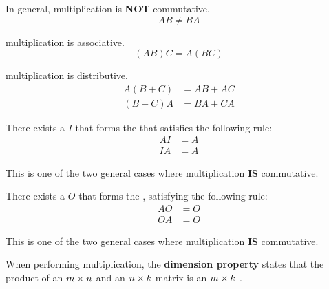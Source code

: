\begin{propertylist}
\item In general,  multiplication is \textbf{NOT} commutative.\label{prop:Matrix_Not_Commutative}
  \begin{equation}\label{eq:Matrix_Mult_Not_Commutative}
    AB \neq BA
  \end{equation}

\item {} multiplication is associative.\label{prop:Matrix_Associativity}
  \begin{equation}\label{eq:Matrix_Mult_Associativity}
    (AB) C = A (BC)
  \end{equation}
\item {} multiplication is distributive.\label{prop:Matrix_Distributivity}
  \begin{equation}\label{eq:Matrix_Mult_Distributivity}
    \begin{aligned}
      A (B+C) &= AB + AC \\
      (B+C) A &= BA + CA
    \end{aligned}
  \end{equation}

\item There exists a  $I$ that forms the  that satisfies the following rule:\label{prop:Mult_Identity_Matrix}
  \begin{equation}\label{eq:Mult_Identity_Matrix}
    \begin{aligned}
      AI &= A \\
      IA &= A
    \end{aligned}
  \end{equation}
  \begin{remark*}
    This is one of the two general cases where  multiplication \textbf{IS} commutative.
  \end{remark*}

\item There exists a  $O$ that forms the , satisfying the following rule:\label{prop:Mult_Zero_Matrix}
  \begin{equation}\label{eq:Mult_Zero_Matrix}
    \begin{aligned}
      AO &= O \\
      OA &= O
    \end{aligned}
  \end{equation}
  \begin{remark*}
    This is one of the two general cases where  multiplication \textbf{IS} commutative.
  \end{remark*}

\item When performing multiplication, the \textbf{dimension property} states that the product of an $m \times n$ and an $n \times k$ matrix is an $m \times k$ .\label{prop:Mult_Dimension_Property}
\end{propertylist}

